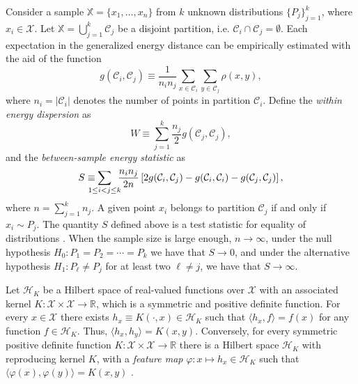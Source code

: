 \documentclass{article}
\newcommand\kk{K}
\newcommand\kkk{h}
\newcommand\Hk{{\mathcal{H}}_{\kk}}
\newcommand\HH{\mathcal{H}}
\newcommand\C{{\mathcal{C}}}
\begin{document}
Consider a sample $\mathbb{X} = \{ x_1,\dotsc, x_n \}$ 
from $k$ unknown distributions $\{ P_j \}_{j=1}^k$,
where $x_i \in \mathcal{X}$.
Let $\mathbb{X} = \bigcup_{j=1}^k \C_j$ be a disjoint
partition, i.e. $\C_i \cap \C_j = \emptyset$.
Each expectation in the generalized energy distance
can be empirically estimated with the aid of the
function
\begin{equation}
\label{eq:g_def}
g (\C_i, \C_j) \equiv 
\dfrac{1}{n_i n_j}
\sum_{x \in \C_i} 
\sum_{y \in \C_j} \rho(x, y) ,
\end{equation}
where $n_i = |\C_i|$ denotes the number of points in partition
$\C_i$. 
Define the \emph{within energy dispersion} as
\begin{equation}
\label{eq:within}
W \equiv
\sum_{j=1}^{k} \dfrac{n_j}{2} g(\C_j, \C_j),
\end{equation}
and the \emph{between-sample energy statistic} as
\begin{equation}
\label{eq:between}
S \equiv \hspace{-1em}
\sum_{1 \le  i < j \le k } \hspace{-.5em} \dfrac{n_i n_{j}}{2 n} \left[
2 g(\C_i, \C_j) - 
g(\C_i, \C_i) - 
g(\C_j, \C_j)
\right],
\end{equation}
where $n = \sum_{j=1}^k n_j$.
A given point $x_i$ belongs to partition $\C_j$
if and only if $x_i \sim P_j$. 
The quantity $S$ defined above is
a test statistic for equality of distributions
\citep{Szkely2013}.
When the sample size is large enough, $n\to \infty$,
under the null hypothesis $H_0: P_1=P_2=\dotsm=P_k$ we have that
$S\to 0$, 
and under
the alternative hypothesis $H_1: P_\ell \ne P_j$ for at least two $\ell\ne j$, 
we have that $S \to \infty$.

Let $\HH_\kk$ be a Hilbert space of real-valued functions
over $\mathcal{X}$ with an associated kernel
$\kk : \mathcal{X} \times \mathcal{X} \to 
\mathbb{R}$, which is a symmetric and positive definite function.
For every $x \in \mathcal{X}$ there exists 
$h_x \equiv \kk(\cdot,x) \in \Hk$ such that  $\langle h_x, f \rangle = f(x)$
for any function $f \in \Hk$. Thus, 
$\langle h_x, h_y \rangle = \kk(x,y)$.
Conversely, 
for every symmetric
positive definite function $\kk: \mathcal{X}\times \mathcal{X} \to
\mathbb{R}$ there is a Hilbert space $\Hk$ with reproducing
kernel $\kk$, with a 
\emph{feature map} $\varphi: x \mapsto \kkk_x \in \Hk$ such
that $\langle \varphi(x), \varphi(y) \rangle = \kk(x, y)$
\citep{Aronszajn}.  
\end{document}
